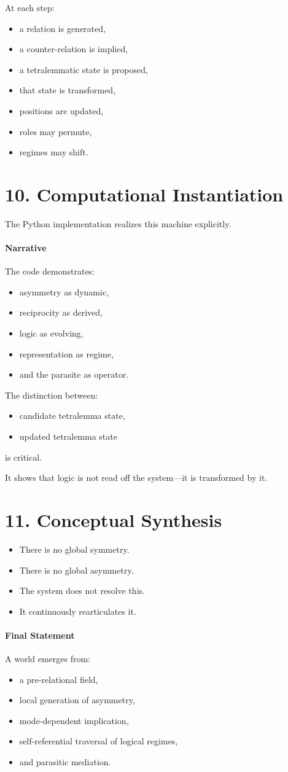 \documentclass[11pt]{article}
\begin{document}
At each step:
\begin{itemize}
\item a relation is generated,
\item a counter-relation is implied,
\item a tetralemmatic state is proposed,
\item that state is transformed,
\item positions are updated,
\item roles may permute,
\item regimes may shift.
\end{itemize}

\section{10. Computational Instantiation}

The Python implementation realizes this machine explicitly.

\paragraph{Narrative}
The code demonstrates:
\begin{itemize}
\item asymmetry as dynamic,
\item reciprocity as derived,
\item logic as evolving,
\item representation as regime,
\item and the parasite as operator.
\end{itemize}

The distinction between:
\begin{itemize}
\item candidate tetralemma state,
\item updated tetralemma state
\end{itemize}
is critical.

It shows that logic is not read off the system—it is transformed by it.

\section{11. Conceptual Synthesis}

\begin{itemize}
\item There is no global symmetry.
\item There is no global asymmetry.
\item The system does not resolve this.
\item It continuously rearticulates it.
\end{itemize}

\paragraph{Final Statement}

A world emerges from:
\begin{itemize}
\item a pre-relational field,
\item local generation of asymmetry,
\item mode-dependent implication,
\item self-referential traversal of logical regimes,
\item and parasitic mediation.
\end{itemize}
\end{document}
